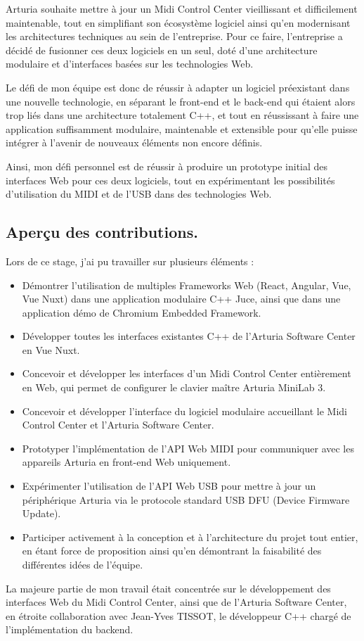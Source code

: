 \documentclass[francais]{rapportPFE}  %
\begin{document}
Arturia souhaite mettre à jour un Midi Control Center vieillissant et difficilement maintenable, tout en simplifiant son écosystème logiciel ainsi qu'en modernisant les architectures techniques au sein de l'entreprise. Pour ce faire, l'entreprise a décidé de fusionner ces deux logiciels en un seul, doté d'une architecture modulaire et d'interfaces basées sur les technologies Web. 

Le défi de mon équipe est donc de réussir à adapter un logiciel préexistant dans une nouvelle technologie, en séparant le front-end et le back-end qui étaient alors trop liés dans une architecture totalement C++, et tout en réussissant à faire une application suffisamment modulaire, maintenable et extensible pour qu'elle puisse intégrer à l'avenir de nouveaux éléments non encore définis.

Ainsi, mon défi personnel est de réussir à produire un prototype initial des interfaces Web pour ces deux logiciels, tout en expérimentant les possibilités d'utilisation du MIDI et de l'USB dans des technologies Web.



\subsection{Aperçu des contributions.}
Lors de ce stage, j'ai pu travailler sur plusieurs éléments : 
\begin{itemize}
    \setlength\itemsep{0em}
    \item Démontrer l'utilisation de multiples Frameworks Web (React, Angular, Vue, Vue Nuxt) dans une application modulaire C++ Juce, ainsi que dans une application démo de Chromium Embedded Framework.
    \item Développer toutes les interfaces existantes C++ de l'Arturia Software Center en Vue Nuxt.
    \item Concevoir et développer les interfaces d'un Midi Control Center entièrement en Web, qui permet de configurer le clavier maître Arturia MiniLab 3.
    \item Concevoir et développer l'interface du logiciel modulaire accueillant le Midi Control Center et l'Arturia Software Center.
    \item Prototyper l'implémentation de l'API Web MIDI pour communiquer avec les appareils Arturia en front-end Web uniquement.
    \item Expérimenter l'utilisation de l'API Web USB pour mettre à jour un périphérique Arturia via le protocole standard USB DFU (Device Firmware Update).
    \item Participer activement à la conception et à l'architecture du projet tout entier, en étant force de proposition ainsi qu'en démontrant la faisabilité des différentes idées de l'équipe.
\end{itemize}
La majeure partie de mon travail était concentrée sur le développement des interfaces Web du Midi Control Center, ainsi que de l'Arturia Software Center, en étroite collaboration avec Jean-Yves TISSOT, le développeur C++ chargé de l'implémentation du backend. 
\end{document}
